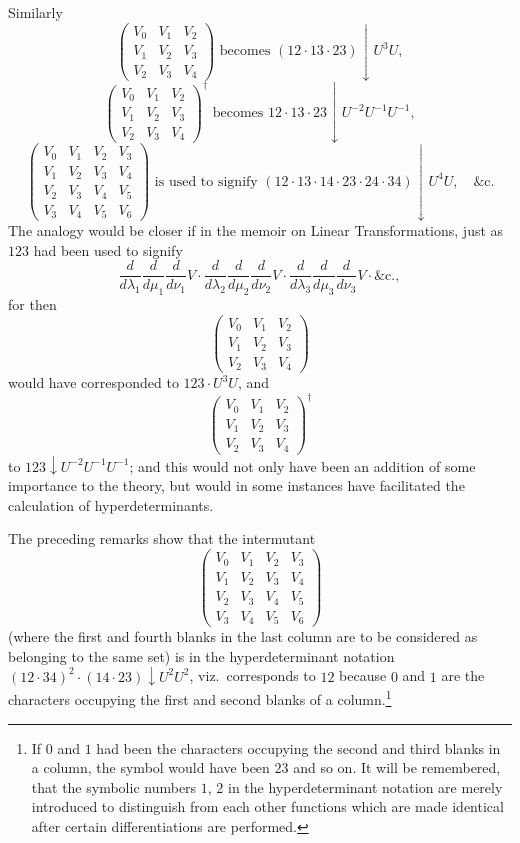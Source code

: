 \documentclass[11pt,a4paper]{article}
\theoremstyle{plain}
\begin{document}
Similarly
\[\begin{pmatrix} V_0 & V_1 & V_2 \\ V_1 & V_2 & V_3 \\ V_2 & V_3 & V_4 \end{pmatrix} \text{ becomes } (12 \cdot 13 \cdot 23)\downarrow U^3 U,\]
\[\begin{pmatrix} V_0 & V_1 & V_2 \\ V_1 & V_2 & V_3 \\ V_2 & V_3 & V_4 \end{pmatrix}^{\dagger} \text{ becomes } 12 \cdot 13 \cdot 23\downarrow U^{-2} U^{-1} U^{-1},\]
\[\begin{pmatrix} V_0 & V_1 & V_2 & V_3 \\ V_1 & V_2 & V_3 & V_4 \\ V_2 & V_3 & V_4 & V_5 \\ V_3 & V_4 & V_5 & V_6 \end{pmatrix} \text{ is used to signify } (12 \cdot 13 \cdot 14 \cdot 23 \cdot 24 \cdot 34)\downarrow U^4 U, \quad \&\text{c.}\]
The analogy would be closer if in the memoir on Linear Transformations, just as $123$ had been used to signify
\[\frac{d}{d\lambda_1}\frac{d}{d\mu_1}\frac{d}{d\nu_1}V \cdot \frac{d}{d\lambda_2}\frac{d}{d\mu_2}\frac{d}{d\nu_2}V \cdot \frac{d}{d\lambda_3}\frac{d}{d\mu_3}\frac{d}{d\nu_3}V \cdot \&\text{c.},\]
for then
\[\begin{pmatrix} V_0 & V_1 & V_2 \\ V_1 & V_2 & V_3 \\ V_2 & V_3 & V_4 \end{pmatrix}\]
would have corresponded to $123 \cdot U^3 U$, and
\[\begin{pmatrix} V_0 & V_1 & V_2 \\ V_1 & V_2 & V_3 \\ V_2 & V_3 & V_4 \end{pmatrix}^{\dagger}\]
to $123\downarrow U^{-2} U^{-1} U^{-1}$; and this would not only have been an addition of some importance to the theory, but would in some instances have facilitated the calculation of hyperdeterminants.

The preceding remarks show that the intermutant
\[\begin{pmatrix} V_0 & V_1 & V_2 & V_3 \\ V_1 & V_2 & V_3 & V_4 \\ V_2 & V_3 & V_4 & V_5 \\ V_3 & V_4 & V_5 & V_6 \end{pmatrix}\]
(where the first and fourth blanks in the last column are to be considered as belonging to the same set) is in the hyperdeterminant notation $(12 \cdot 34)^2 \cdot (14 \cdot 23)\downarrow U^2 U^2$, viz.\ corresponds to $12$ because $0$ and $1$ are the characters occupying the first and second blanks of a column.\footnote{If $0$ and $1$ had been the characters occupying the second and third blanks in a column, the symbol would have been $23$ and so on. It will be remembered, that the symbolic numbers $1$, $2$ in the hyperdeterminant notation are merely introduced to distinguish from each other functions which are made identical after certain differentiations are performed.}
\end{document}
